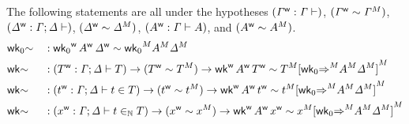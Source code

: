 \begin{lemma}
The following statements are all under the
hypotheses
  $(\wf{\GG} : \GG \vdash)$,
  $(\wf\GG \sim \model{\GG})$,
  $(\wf{\GD} : \GG\merge\GD \vdash)$,
  $(\wf\GD \sim \model{\GD})$,
  $(\wf{A} : \GG \vdash A)$,
  and
  $(\wf{A} \sim \model{A})$.
\begin{alignat*}{5}
  & \wkO{\sim}  &&
   :
  \wf{\wkO}\,\wf{A}\,\wf{\GD}\sim\model{\wkO}\model{A}\model{\GD}
  \\
  & \wk{\sim} && :
  (\wf{T} : \GG\merge\GD \vdash T) \ra
  (\wf{T} \sim \model{T}) \ra
  \wf{\wk}\,\wf{A}\,\wf{T}\sim\model{T}\model{[\model{\wkO{\Rightarrow}}\model{A}\model{\GD}]}
  \\
  & \wk{\sim} && :
  (\wf{t} : \GG\merge\GD \vdash t\in T) \ra
  (\wf{t} \sim \model{t}) \ra
  \wf{\wk}\,\wf{A}\,\wf{t}\sim\model{t}\model{[\model{\wkO{\Rightarrow}}\model{A}\model{\GD}]}
  \\
  & \wk{\sim} && :
  (\wf{x} : \GG\merge\GD \vdash t\invar T) \ra
  (\wf{x} \sim \model{x}) \ra
  \wf{\wk}\,\wf{A}\,\wf{x}\sim\model{x}\model{[\model{\wkO{\Rightarrow}}\model{A}\model{\GD}]}
\end{alignat*}
\end{lemma}
